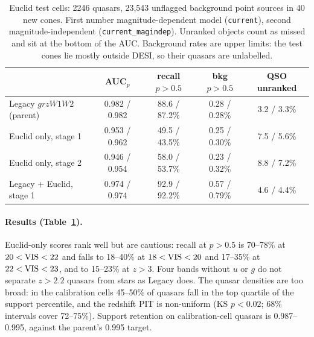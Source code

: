 \documentclass[11pt,a4paper]{article}
\newcommand{\code}[1]{\texttt{#1}}
\begin{document}
\begin{table}[!htbp]\centering\small
\caption{Euclid test cells: 2246 quasars, 23,543 unflagged background point sources in 40 new cones. First number
magnitude-dependent model (\code{current}), second magnitude-independent (\code{current\_magindep}). Unranked
objects count as missed and sit at the bottom of the AUC. Background rates are upper limits: the test cones lie
mostly outside DESI, so their quasars are unlabelled.}\label{tab:euclid}
\begin{tabular}{lcccc}
\toprule
 & AUC$_p$ & recall $p>0.5$ & bkg $p>0.5$ & QSO unranked \\
\midrule
Legacy $grzW1W2$ (parent) & 0.982 / 0.982 & 88.6 / 87.2\% & 0.28 / 0.28\% & 3.2 / 3.3\% \\
Euclid only, stage 1 & 0.953 / 0.962 & 49.5 / 43.5\% & 0.25 / 0.30\% & 7.5 / 5.6\% \\
Euclid only, stage 2 & 0.946 / 0.954 & 58.0 / 53.7\% & 0.23 / 0.32\% & 8.8 / 7.2\% \\
Legacy + Euclid, stage 1 & 0.974 / 0.974 & 92.9 / 92.2\% & 0.57 / 0.79\% & 4.6 / 4.4\% \\
\bottomrule
\end{tabular}
\end{table}

\paragraph{Results (Table~\ref{tab:euclid}).} Euclid-only scores rank well but are cautious: recall at $p>0.5$
is 70--78\% at $20<{\rm VIS}<22$ and falls to 18--40\% at $18<{\rm VIS}<20$ and 17--35\% at $22<{\rm VIS}<23$, and to
15--23\% at $z>3$. Four bands without $u$ or $g$ do not separate $z>2.2$ quasars from stars as Legacy does. The
quasar densities are too broad: in the calibration cells 45--50\% of quasars fall in the top quartile of the
support percentile, and the redshift PIT is non-uniform (KS $p<0.02$; 68\% intervals cover 72--75\%). Support
retention on calibration-cell quasars is 0.987--0.995, against the parent's 0.995 target.
\end{document}
